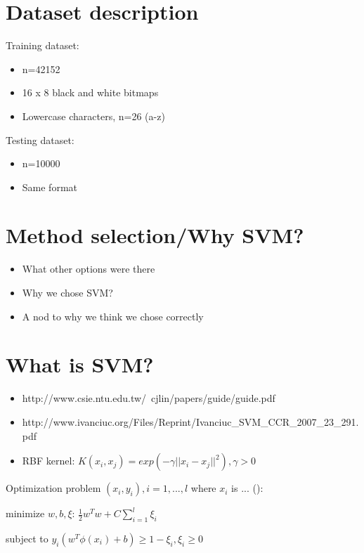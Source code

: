 \documentclass{netsec2012}
\begin{document}
\section{Dataset description}

Training dataset:

\begin{itemize}
\item n=42152
\item 16 x 8 black and white bitmaps
\item Lowercase characters, n=26 (a-z)
\end{itemize}

Testing dataset:

\begin{itemize}
\item n=10000
\item Same format
\end{itemize}

\section{Method selection/Why SVM?}

\begin{itemize}
\item What other options were there
\item Why we chose SVM?
\item A nod to why we think we chose correctly
\end{itemize}

\section{What is SVM?}

\begin{itemize}
\item http://www.csie.ntu.edu.tw/~cjlin/papers/guide/guide.pdf
\item http://www.ivanciuc.org/Files/Reprint/Ivanciuc\_SVM\_CCR\_2007\_23\_291.pdf
\item RBF kernel: $K(x_i, x_j) = exp(-\gamma || x_i - x_j ||^2), \gamma > 0$
\end{itemize}

Optimization problem $(x_i, y_i), i = 1, ..., l$ where $x_i$ is ... (\cite{libsvm_guide}):

minimize $w,b,\xi$: $\frac{1}{2}w^Tw + C \sum_{i=1}^l\xi_i$

subject to $y_i(w^T \phi(x_i) + b) \ge 1 - \xi_i, \xi_i \ge 0$
\end{document}
